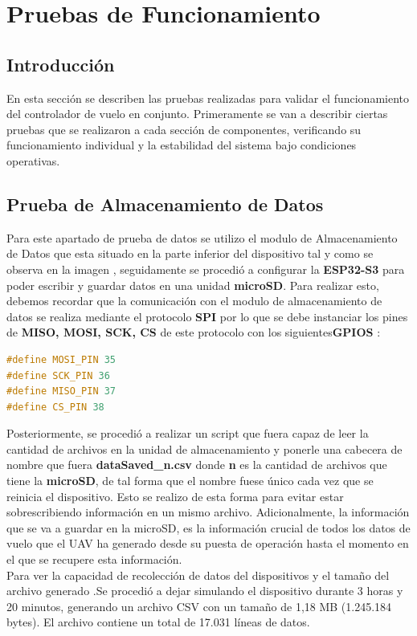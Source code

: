 \section{Pruebas de Funcionamiento}


\subsection{Introducción}
En esta sección se describen las pruebas realizadas para validar el funcionamiento del controlador de vuelo en conjunto. Primeramente se van a describir ciertas pruebas que se realizaron a cada sección de componentes, verificando su funcionamiento individual y la estabilidad del sistema bajo condiciones operativas.
\subsection{Prueba de Almacenamiento de Datos}
\vspace{5 px}
Para este apartado de prueba de datos se utilizo el modulo de Almacenamiento de Datos que esta situado en la parte inferior del dispositivo tal y como se observa en la imagen , seguidamente se procedió a configurar la \textbf{ESP32-S3} para poder escribir y guardar datos en una unidad \textbf{microSD}. Para realizar esto, debemos recordar que la comunicación con el modulo de almacenamiento de datos se realiza mediante el protocolo \textbf{SPI} por lo que se debe instanciar los pines de \textbf{MISO, MOSI, SCK, CS} de este protocolo con los siguientes\textbf{GPIOS} :
\vspace{5 px}
\begin{lstlisting}[language=C++]
#define MOSI_PIN 35
#define SCK_PIN 36
#define MISO_PIN 37
#define CS_PIN 38
\end{lstlisting}

\vspace{5 px}

Posteriormente, se procedió a realizar un script que fuera capaz de leer la cantidad de archivos en la unidad de almacenamiento y ponerle una cabecera de nombre que fuera \textbf{dataSaved\_n.csv} donde \textbf{n} es la cantidad de archivos que tiene la \textbf{microSD}, de tal forma que el nombre fuese único cada vez que se reinicia el dispositivo. Esto se realizo de esta forma para evitar estar sobrescribiendo información en un mismo archivo. Adicionalmente, la información que se va a guardar en la microSD, es la información crucial de todos los datos de vuelo que el UAV ha generado desde su puesta de operación hasta el momento en el que se recupere esta información. \\
\vspace{10 px}
Para ver la capacidad de recolección de datos del dispositivos y el tamaño del archivo generado .Se procedió a dejar simulando el dispositivo durante 3  horas y 20 minutos, generando un archivo CSV con un tamaño de 1,18 MB (1.245.184 bytes). El archivo contiene un total de 17.031 líneas de datos.


